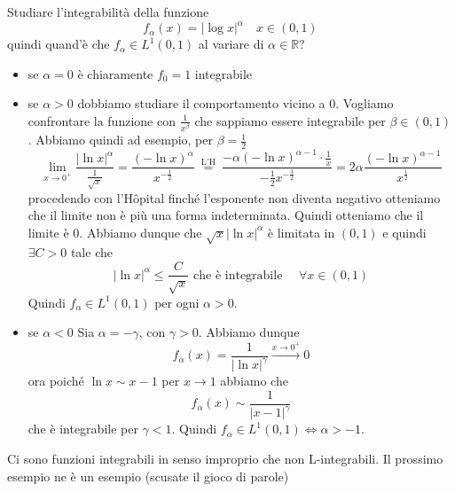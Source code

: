 \begin{eser}
    Studiare l'integrabilità della funzione 
    \[
    f_{\alpha}(x) = {\left| \log x \right|}^{\alpha} \quad x \in (0, 1)
    \]
    quindi quand'è che \(f_\alpha \in L^{1}(0, 1)\) al variare di \(\alpha \in
    \mathbb{R}\)?
\begin{itemize}[label = --]
    \item se \(\alpha = 0\) è chiaramente \(f_0 = 1\) integrabile
    \item se \(\alpha > 0\) dobbiamo studiare il comportamento vicino a \(0\).
        Vogliamo confrontare la funzione con \(\frac{1}{x^{\beta}}\) che
        sappiamo essere integrabile per \(\beta \in (0, 1)\). Abbiamo quindi ad
        esempio, per \(\beta = \frac{1}{2}\) 
        \[
            \lim_{x \to 0^{+}} \frac{{|\ln x|}^{\alpha}}{\frac{1}{\sqrt{x}}} =
            \frac{{(-\ln x)}^{\alpha}}{x^{-\frac{1}{2}}} \overset{\text{ L'H
            }}{=} \frac{- \alpha {(-\ln
            x)}^{\alpha-1} \cdot \frac{1}{x} }{ -\frac{1}{2} x^{-\frac{3}{2}} }
            = 2 \alpha \frac{{(-\ln x)}^{\alpha - 1}}{x^{\frac{1}{2}}}
        \]
        procedendo con l'Hôpital finché l'esponente non diventa negativo
        otteniamo che il limite non è più una forma indeterminata. Quindi
        otteniamo che il limite è \(0\). Abbiamo dunque che \(\sqrt{x} |\ln x
        |^{\alpha}\) è limitata in \((0, 1)\) e quindi \(\exists C >0\) tale che 
        \[
            |\ln x|^{\alpha} \le \frac{C}{\sqrt{x}} \text{ che è integrabile } \quad \forall x \in (0, 1)
        \]
        Quindi \(f_{\alpha} \in L^{1}(0, 1)\) per ogni \(\alpha > 0\).
    \item se \(\alpha < 0\) Sia \(\alpha = -\gamma\), con \(\gamma > 0\).
        Abbiamo dunque
        \[
            f_\alpha (x) = \frac{1}{{|\ln x|}^{\gamma}} \overset{ x \to
            0^{+}}{\longrightarrow} 0
        \]
        ora poiché \(\ln x \sim x - 1\) per \(x \to 1\) abbiamo che 
        \[
            f_\alpha (x) \sim \frac{1}{|x-1|^{\gamma}} 
        \]
        che è integrabile per \(\gamma < 1\). Quindi \(f_{\alpha} \in L^{1}(0,1)
        \iff \alpha > -1\).
\end{itemize}
\end{eser}
\begin{remark}
    Ci sono funzioni integrabili in senso improprio che non L-integrabili. Il
    prossimo esempio ne è un esempio (scusate il gioco di parole)
\end{remark}
